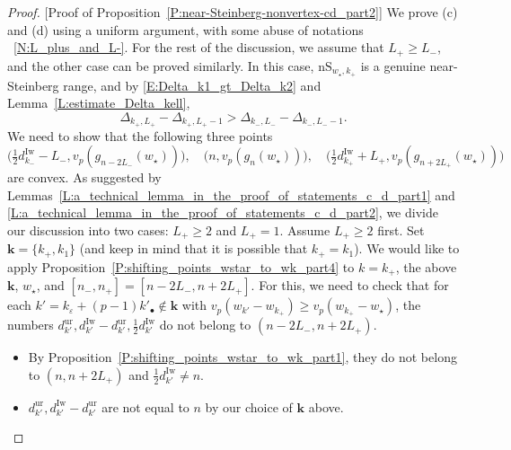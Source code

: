 \begin{proof}
    [Proof of Proposition~\ref{P:near-Steinberg-nonvertex-cd_part2}]
    We prove (c) and (d) using a uniform argument, with some abuse of notations ~\ref{N:L_plus_and_L-}.
    For the rest of the discussion, we assume that $L_+ \geq L_-$, and the other case can be proved similarly. In this case, ${\mathrm{nS}}_{w_\star, k_+}$ is a genuine near-Steinberg range, and by  \eqref{E:Delta_k1_gt_Delta_k2} and Lemma~\ref{L:estimate_Delta_kell},
    \[
    \Delta_{k_+, L_+} - \Delta_{k_+, L_+-1} > \Delta_{k_-, L_-} - \Delta_{k_-, L_--1}.
    \]
    We need to show that the following three points
    \begin{equation}
    \label{E:three_points_convex}
    \big( \tfrac 12d_{k_-}^{\mathrm{Iw}}- L_-, v_p(g_{n-2L_-}(w_\star))\big), \quad \big( n, v_p(g_{n}(w_\star))\big), \quad \big( \tfrac 12d_{k_+}^{\mathrm{Iw}}+ L_+, v_p(g_{n+2L_+}(w_\star))\big)
    \end{equation}
    are convex.
    As suggested by Lemmas~\ref{L:a_technical_lemma_in_the_proof_of_statements_c_d_part1} and \ref{L:a_technical_lemma_in_the_proof_of_statements_c_d_part2}, we divide our discussion into two cases: $L_+\geq 2$ and $L_+=1$.
    Assume $L_+\geq 2$ first.
    Set ${\mathbf{k}}= \{k_+,k_1\}$ (and keep in mind that it is possible that $k_+=k_1$).
    We would like to apply Proposition~\ref{P:shifting_points_wstar_to_wk_part4} to  $k = k_+$, the above ${\mathbf{k}}$, $w_\star$, and $[n_-, n_+] = [n-2L_-, n+2L_+]$. For this, we need to check that for each $k' = k_\varepsilon + (p-1)k'_\bullet \notin {\mathbf{k}}$ with $v_p(w_{k'}-w_{k_+}) \geq v_p(w_{k_+}-w_\star)$, the numbers $d_{k'}^{\mathrm{ur}}, d_{k'}^{{\mathrm{Iw}}}-d_{k'}^{{\mathrm{ur}}}, \frac 12d_{k'}^{\mathrm{Iw}}$ do not belong to $(n-2L_-, n+2L_+)$.
    \begin{itemize}
    \item
    By Proposition~\ref{P:shifting_points_wstar_to_wk_part1}, they do not belong to $(n, n+2L_+)$ and $\frac 12d_{k'}^{\mathrm{Iw}}\neq n$.
    \item
    $d_{k'}^{\mathrm{ur}}, d_{k'}^{{\mathrm{Iw}}}-d_{k'}^{{\mathrm{ur}}}$ are not equal to $n$ by our choice of ${\mathbf{k}}$ above.

\end{itemize}
\end{proof}
